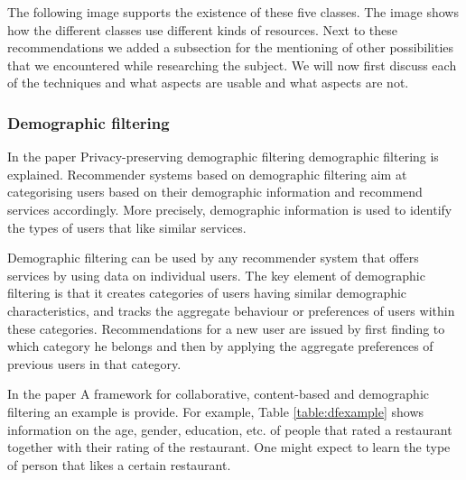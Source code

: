 \documentclass[]{article}
\begin{document}
The following image supports the existence of these five classes.
The image shows how the different classes use different kinds of resources.
Next to these recommendations we added a subsection for the mentioning of other possibilities that we encountered while researching the subject.
We will now first discuss each of the techniques and what aspects are usable and what aspects are not.

\subsubsection{Demographic filtering}
In the paper Privacy-preserving demographic filtering\cite{aimeur2006privacy} demographic filtering is explained.
Recommender systems based on demographic filtering aim at categorising users based on their demographic information and recommend services accordingly. 
More precisely, demographic information is used to identify the types of users that like similar services. 

Demographic filtering can be used by any recommender system that offers services by using data on individual users. 
The key element of demographic filtering is that it creates categories of users having similar demographic characteristics, and tracks the aggregate behaviour or preferences of users within these categories. 
Recommendations for a new user are issued by first finding to which category he belongs and then by applying the aggregate preferences of previous users in that category.

In the paper A framework for collaborative, content-based and demographic filtering\cite{pazzani1999framework} an example is provide. 
For example, Table \ref{table:dfexample}  shows information on the age, gender, education, etc. of people that rated
a restaurant together with their rating of the restaurant. 
One might expect to learn the type of person that likes a certain restaurant. \\ 
\end{document}
